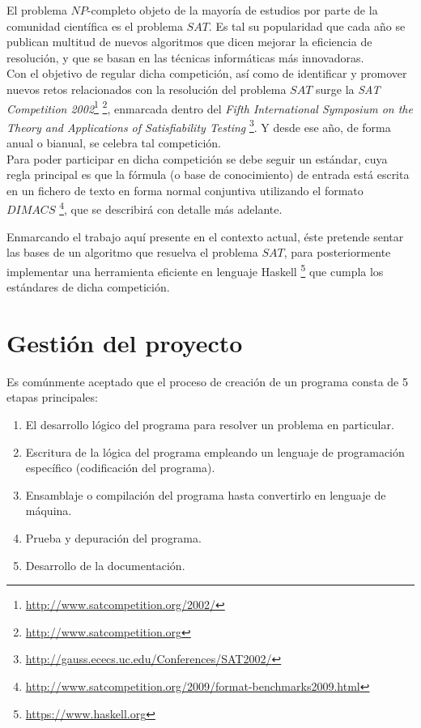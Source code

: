El problema $NP$-completo objeto de la mayoría de estudios por parte de la comunidad científica es el problema $SAT$. Es tal su popularidad que cada año se publican multitud de nuevos algoritmos que dicen mejorar la eficiencia de resolución, y que se basan en las técnicas informáticas más innovadoras. \\

Con el objetivo de regular dicha competición, así como de identificar y promover nuevos retos relacionados con la resolución del problema $SAT$ surge la \textit{SAT Competition 2002}\footnote{\url{http://www.satcompetition.org/2002/}} \footnote{\url{http://www.satcompetition.org}}, enmarcada dentro del \textit{Fifth  International Symposium on the Theory and Applications of Satisfiability Testing} \footnote{\url{http://gauss.ececs.uc.edu/Conferences/SAT2002/}}. Y desde ese año, de forma anual o bianual, se celebra tal competición. \\

Para poder participar en dicha competición se debe seguir un estándar, cuya regla principal es que la fórmula (o base de conocimiento) de entrada está escrita en un fichero de texto en forma normal conjuntiva utilizando el formato $DIMACS$ \footnote{\url{http://www.satcompetition.org/2009/format-benchmarks2009.html}}, que se describirá con detalle más adelante.

Enmarcando el trabajo aquí presente en el contexto actual, éste pretende sentar las bases de un algoritmo que resuelva el problema $SAT$, para posteriormente implementar una herramienta eficiente en lenguaje Haskell \footnote{\url{https://www.haskell.org}} que cumpla los estándares de dicha competición.\\


\section{Gestión del proyecto}
Es comúnmente aceptado que el proceso de creación de un programa consta de 5 etapas principales:

\begin{enumerate}
\item El desarrollo lógico del programa para resolver un problema en particular.
\item Escritura de la lógica del programa empleando un lenguaje de programación específico (codificación del programa).
\item Ensamblaje o compilación del programa hasta convertirlo en lenguaje de máquina.
\item Prueba y depuración del programa.
\item Desarrollo de la documentación.
\end{enumerate}

